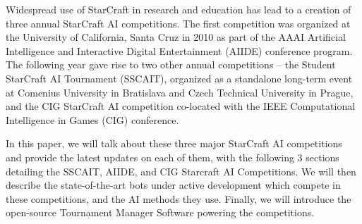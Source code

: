 Widespread use of StarCraft in research and education has lead to a creation of three annual StarCraft AI competitions. The first competition was organized at the University of California, Santa Cruz in 2010 as part of the AAAI Artificial Intelligence and Interactive Digital Entertainment (AIIDE) conference program. The following year gave rise to two other annual competitions -- the Student StarCraft AI Tournament (SSCAIT), organized as a standalone long-term event at Comenius University in Bratislava and Czech Technical University in Prague, and the CIG StarCraft AI competition co-located with the IEEE Computational Intelligence in Games (CIG) conference.

In this paper, we will talk about these three major StarCraft AI competitions and provide the latest updates on each of them, with the following 3 sections detailing the SSCAIT, AIIDE, and CIG Starcraft AI Competitions. We will then describe the state-of-the-art bots under active development which compete in these competitions, and the AI methods they use. Finally, we will introduce the open-source Tournament Manager Software powering the competitions. 




